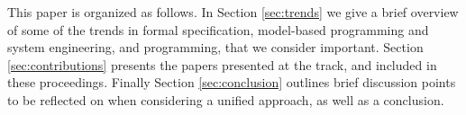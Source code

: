 This paper is organized as follows.
In Section \ref{sec:trends} we give a brief overview of some 
of the trends in formal specification, model-based programming and system engineering, and programming, that we consider 
important. 
Section \ref{sec:contributions} presents the papers presented at the track, and included in these proceedings.
Finally Section \ref{sec:conclusion} outlines
brief discussion points to be reflected on
when considering a unified approach, as well
as a conclusion.
